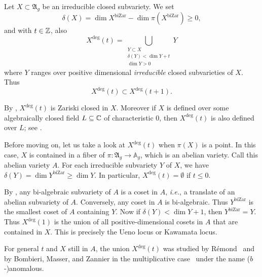 \documentclass[12pt,oneside]{amsart}
\begin{document}
Let $X\subset\mathfrak{A}_{g}$ be an irreducible closed subvariety. 
We set
\begin{equation*}
  \delta(X) = \dim X^{\mathrm{biZar}} - \dim \pi(X^{\mathrm{biZar}})
  \ge 0,
\end{equation*}
and with $t\in{\mathbb{Z}}$, also
\begin{equation}
  \label{def:degtlocus}
  X^{\mathrm{deg}}(t)=\bigcup_{\substack{Y\subset X \\ \delta(Y) < \dim Y
  + t \\ \dim Y > 0}} Y
\end{equation}
where $Y$ ranges over positive dimensional \textit{irreducible} closed
subvarieties of $X$. Thus
\begin{equation*}
   X^{\mathrm{deg}}(t)\subset  X^{\mathrm{deg}}(t+1).
\end{equation*}

By \cite[Theorem~7.1]{GaoBettiRank}, $X^{\mathrm{deg}}(t)$ is Zariski
closed in $X$. Moreover if $X$ is defined over some algebraically closed field $L \subseteq {\mathbb{C}}$ of characteristic $0$, then 
$X^{\mathrm{deg}}(t)$ is also defined over $L$; see \cite[Proposition~4.2.6]{GaoHDR}.


\begin{remark}
  Before moving on, let us take a look at $X^{\mathrm{deg}}(t)$ when
  $\pi(X)$ is a point. In this case, $X$ is contained in a fiber of $\pi
  \colon \mathfrak{A}_g \rightarrow \mathbb{A}_g$, which is an abelian
  variety. Call this abelian variety $A$. For each irreducible
  subvariety $Y$ of $X$, we have $\delta(Y) = \dim Y^{\mathrm{biZar}}
  \ge \dim Y$. In particular, $X^{\mathrm{deg}}(t) = \emptyset$ if $t
  \le 0$. 
  
  By \cite[Proposition~5.1]{UYweaklyspecial}, any bi-algebraic
  subvariety
  of $A$
  is a
  coset in $A$, \textit{i.e.}, a translate of an abelian subvariety of
  $A$. Conversely, any coset in $A$ is bi-algebraic.
  Thus $Y^{\mathrm{biZar}}$ is the smallest coset of $A$ containing $Y$. 
  Now if $\delta(Y) < \dim Y+1$, then $Y^{\mathrm{biZar}} =
  Y$.
  Thus $X^{\mathrm{deg}}(1)$ is the union of all positive-dimensional
  cosets in $A$ that are contained in $X$. This is precisely the Ueno
  locus or Kawamata locus.

  For general $t$ and $X$ still in $A$, the union
  $X^{\mathrm{deg}}(t)$ was studied by R\'emond~\cite[$\mathsection
  3$]{RemondInterIII} and by Bombieri, Masser, and Zannier in the
  multiplicative case~\cite{BMZGeometric,BMZUnlikely} under the name
  ($b$-)anomalous.
\end{remark}
\end{document}
